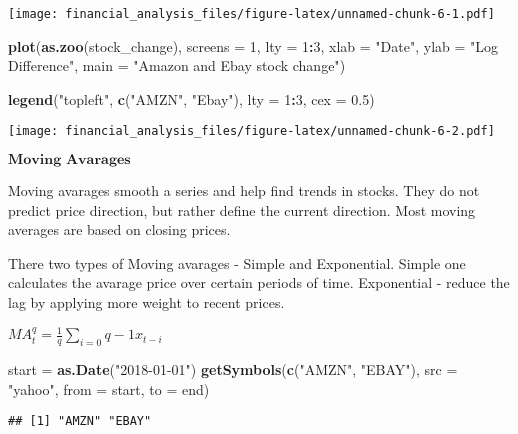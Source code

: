 \documentclass[]{article}
\newenvironment{Shaded}{\begin{snugshade}}{\end{snugshade}}
\newcommand{\KeywordTok}[1]{\textcolor[rgb]{0.13,0.29,0.53}{\textbf{#1}}}
\newcommand{\DataTypeTok}[1]{\textcolor[rgb]{0.13,0.29,0.53}{#1}}
\newcommand{\DecValTok}[1]{\textcolor[rgb]{0.00,0.00,0.81}{#1}}
\newcommand{\FloatTok}[1]{\textcolor[rgb]{0.00,0.00,0.81}{#1}}
\newcommand{\StringTok}[1]{\textcolor[rgb]{0.31,0.60,0.02}{#1}}
\newcommand{\OperatorTok}[1]{\textcolor[rgb]{0.81,0.36,0.00}{\textbf{#1}}}
\newcommand{\NormalTok}[1]{#1}
\begin{document}
\texttt{[image: financial\_analysis\_files/figure-latex/unnamed-chunk-6-1.pdf]}

\begin{Shaded}
\begin{Highlighting}[]
\KeywordTok{plot}\NormalTok{(}\KeywordTok{as.zoo}\NormalTok{(stock_change), }\DataTypeTok{screens =} \DecValTok{1}\NormalTok{, }\DataTypeTok{lty =} \DecValTok{1}\OperatorTok{:}\DecValTok{3}\NormalTok{, }\DataTypeTok{xlab =} \StringTok{"Date"}\NormalTok{, }\DataTypeTok{ylab =} \StringTok{"Log Difference"}\NormalTok{, }\DataTypeTok{main =} \StringTok{"Amazon and Ebay stock change"}\NormalTok{)}

\KeywordTok{legend}\NormalTok{(}\StringTok{"topleft"}\NormalTok{, }\KeywordTok{c}\NormalTok{(}\StringTok{"AMZN"}\NormalTok{, }\StringTok{"Ebay"}\NormalTok{), }\DataTypeTok{lty =} \DecValTok{1}\OperatorTok{:}\DecValTok{3}\NormalTok{, }\DataTypeTok{cex =} \FloatTok{0.5}\NormalTok{)}
\end{Highlighting}
\end{Shaded}

\texttt{[image: financial\_analysis\_files/figure-latex/unnamed-chunk-6-2.pdf]}

\(\textbf{Moving Avarages}\)

Moving avarages smooth a series and help find trends in stocks. They do
not predict price direction, but rather define the current direction.
Most moving averages are based on closing prices.

There two types of Moving avarages - Simple and Exponential. Simple one
calculates the avarage price over certain periods of time. Exponential -
reduce the lag by applying more weight to recent prices.

\(MA^q_t = \frac{1}{q}\sum_{i=0}{q - 1}x_{t-i}\)

\begin{Shaded}
\begin{Highlighting}[]
\NormalTok{start =}\StringTok{ }\KeywordTok{as.Date}\NormalTok{(}\StringTok{"2018-01-01"}\NormalTok{)}
\KeywordTok{getSymbols}\NormalTok{(}\KeywordTok{c}\NormalTok{(}\StringTok{"AMZN"}\NormalTok{, }\StringTok{"EBAY"}\NormalTok{), }\DataTypeTok{src =} \StringTok{"yahoo"}\NormalTok{, }\DataTypeTok{from =}\NormalTok{ start, }\DataTypeTok{to =}\NormalTok{ end)}
\end{Highlighting}
\end{Shaded}

\begin{verbatim}
## [1] "AMZN" "EBAY"
\end{verbatim}
\end{document}
